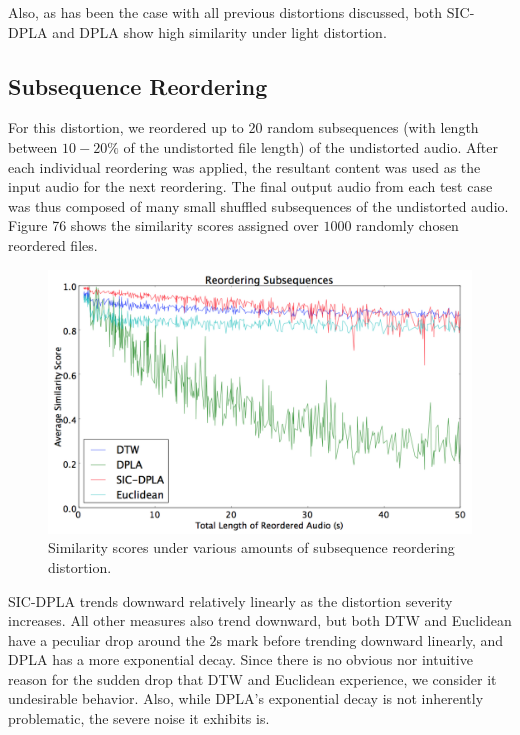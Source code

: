 \documentclass[12pt]{report} 	%
\numberwithin{figure}{chapter}
\numberwithin{table}{chapter}
\numberwithin{equation}{chapter}
\begin{document}
\begin{flushleft}
Also, as has been the case with all previous distortions discussed, both SIC-DPLA and DPLA show high similarity under light distortion.

\subsection{Subsequence Reordering}
For this distortion, we reordered up to $20$ random subsequences (with length between $10-20\%$ of the undistorted file length) of the undistorted audio. After each individual reordering was applied, the resultant content was used as the input audio for the next reordering. The final output audio from each test case was thus composed of many small shuffled subsequences of the undistorted audio. Figure 76 shows the similarity scores assigned over $1000$ randomly chosen reordered files.
\vspace{12pt}
\begin{figure}[h!]
\begin{center}
\includegraphics[scale=0.5,width=\linewidth]{ReorderedAudio}
\caption[Subsequence reordering results]{Similarity scores under various amounts of subsequence reordering distortion.}
\end{center}
\end{figure}
SIC-DPLA trends downward relatively linearly as the distortion severity increases. All other measures also trend downward, but both DTW and Euclidean have a peculiar drop around the $2$s mark before trending downward linearly, and DPLA has a more exponential decay. Since there is no obvious nor intuitive reason for the sudden drop that DTW and Euclidean experience, we consider it undesirable behavior. Also, while DPLA's exponential decay is not inherently problematic, the severe noise it exhibits is.


\end{flushleft}
\end{document}

